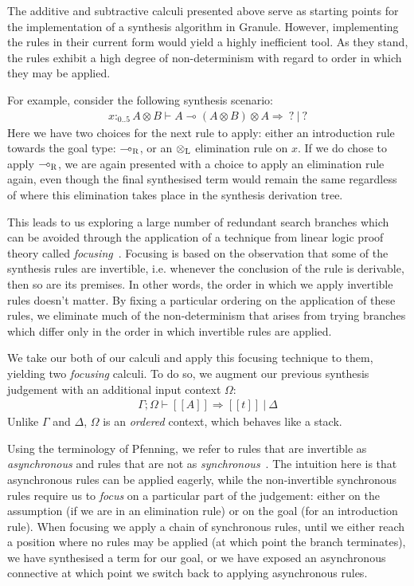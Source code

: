 The additive and subtractive calculi presented above serve as starting points
for the implementation of a synthesis algorithm in Granule. However,
implementing the rules in their current form would yield a highly inefficient
tool. As they stand, the rules exhibit a high degree of non-determinism with
regard to order in which they may be applied. 

For example, consider the following synthesis scenario:
\begin{align*} 
    x :_{0 .. 5} A \otimes B \vdash A \multimap (A \otimes B) \otimes A \Rightarrow\ ?\ |\ ? 
\end{align*}
Here we have two choices for the next rule to apply: either an introduction rule
towards the goal type: $\multimap_\textsc{R}$, or an
$\otimes_{\textsc{L}}$ elimination rule on $x$. If we do chose to apply
$\multimap_\textsc{R}$, we are again presented with a choice to apply an
elimination rule again, even though the final synthesised term would remain the
same regardless of where this elimination takes place in the synthesis
derivation tree. 

This leads to us exploring a large number of redundant search branches which can
be avoided through the application of a technique from linear logic proof theory
called \textit{focusing}~\cite{focusing}. Focusing is based on the observation
that some of the synthesis rules are invertible, i.e. whenever the conclusion of
the rule is derivable, then so are its premises. In other words, the order in
which we apply invertible rules doesn't matter. By fixing a particular ordering
on the application of these rules, we eliminate much of the non-determinism that
arises from trying branches which differ only in the order in which invertible
rules are applied. 

We take our both of our calculi and apply this focusing technique to them,
yielding two \textit{focusing} calculi. To do so, we augment our previous
synthesis judgement with an additional input context $\Omega$:
\begin{align*}
\Gamma ; \Omega \vdash [[ A ]] \Rightarrow [[t ]]\ |\ \Delta
\end{align*}
Unlike $\Gamma$ and $\Delta$, $\Omega$ is an \textit{ordered} context, which 
behaves like a stack.

Using the terminology of Pfenning, we refer to rules that are invertible as
\textit{asynchronous} and rules that are not as
\textit{synchronous}~\cite{pfenninglecture}. The intuition here is that
asynchronous rules can be applied eagerly, while the non-invertible synchronous
rules require us to \textit{focus} on a particular part of the judgement: either
on the assumption (if we are in an elimination rule) or on the goal (for an
introduction rule). When focusing we apply a chain of synchronous rules, until
we either reach a position where no rules may be applied (at which point the
branch terminates), we have synthesised a term for our goal, or we have exposed
an asynchronous connective at which point we switch back to applying
asynchronous rules.

